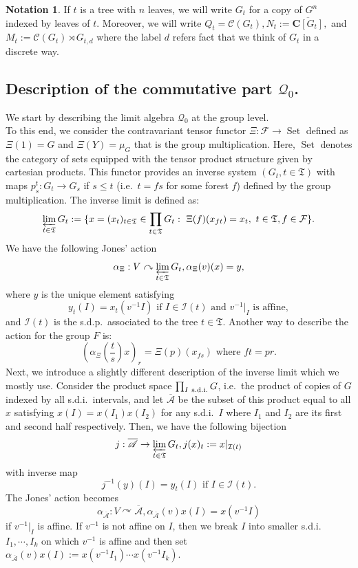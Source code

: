 \documentclass[a4paper,12pt]{amsart}
\numberwithin{equation}{section}
\theoremstyle{definition}
\newtheorem{notation}[theo]{Notation}
\newcommand{\act}{\curvearrowright}
\newcommand{\al}{\alpha}
\newcommand{\oscrA}{{\overline{\mathscr{A}}}}
\newcommand{\scrC}{\mathscr C}
\newcommand{\C}{\mathbf C}
\newcommand{\cF}{\mathcal F}
\newcommand{\cI}{\mathcal I}
\newcommand{\scrQ}{\mathscr Q}
\DeclareMathOperator{\Set}{Set}
\newcommand{\fT}{\mathfrak T}
\begin{document}
\begin{notation}
If $t$ is a tree with $n$ leaves, we will write $G_t$ for a copy of $G^n$ indexed by leaves of $t$.
Moreover, we will write $Q_t=\scrC(G_t), N_t:=\overline{\C [G_t]},$ and $M_t:=\scrC(G_t)\rtimes G_{t,d}$ {where the label $d$ refers fact that we think of $G_t$ in a discrete way.}
\end{notation}

\subsection{Description of the commutative part $\scrQ_0$.}\label{sec:Commutative}
We start by describing the limit algebra $\scrQ_0$ at the group level.\\[0.1cm]
To this end, we consider the contravariant tensor functor $\Xi:\cF\to \Set$ defined as $\Xi(1)=G$ and $\Xi(Y)=\mu_G$ that is the group multiplication.
Here, $\Set$ denotes the category of sets equipped with the tensor product structure given by cartesian products.
This functor provides an inverse system $(G_t, t\in\fT)$ with maps $p_s^{t}:G_{t}\to G_s$ if $s\leq t$ (i.e.~$t=fs$ for some forest $f$) defined by the group multiplication.
The inverse limit is defined as:
$$\varprojlim_{t\in\fT} G_t := \{ x=(x_t)_{t\in \fT} \in \prod_{t\in \fT} G_t : \ \Xi(f)(x_{ft}) = x_t ,\ t\in\fT, f\in\cF\}.$$
We have the following Jones' action 
$$\alpha_\Xi:V\act \varprojlim_{t\in\fT} G_t, \al_\Xi(v)(x) =y,$$
where $y$ is the unique element satisfying $$y_t(I) = x_t(v^{-1} I) \text{ if } I\in\cI(t) \text{ and } v^{-1}|_I \text{ is affine} ,$$
and $\cI(t)$ is the s.d.p.~associated to the tree $t\in\fT.$
Another way to describe the action for the group $F$ is:
$$(\alpha_\Xi(\dfrac{t}{s})x)_r = \Xi(p)(x_{fs}) \text{ where } ft = pr.$$
Next, we introduce a slightly different description of the inverse limit which we mostly use.
Consider the product space $\prod_{I \ \textup{s.d.i.}} G$, i.e.~the product of copies of $G$ indexed by all s.d.i.~intervals, and let $\oscrA$ be the subset of this product equal to all $x$ satisfying $x(I) = x(I_1)x(I_2)$ for any s.d.i.~$I$ where $I_1$ and $I_2$ are its first and second half respectively.
Then, we have the following bijection 
$$j:\oscrA\to \varprojlim_{t\in\fT} G_t, j(x)_t := x|_{\cI(t)}$$
with inverse map
$$j^{-1}(y)(I) = y_t(I) \text{ if } I\in \cI(t).$$
The Jones' action becomes $$\al_\oscrA:V\act \oscrA, \al_\oscrA(v) x (I) = x(v^{-1} I)$$
if $v^{-1}|_I$ is affine.
If $v^{-1}$ is not affine on $I$, then we break $I$ into smaller s.d.i.~$I_1,\cdots,I_k$ on which $v^{-1}$ is affine and then set $\al_\oscrA(v) x (I) := x(v^{-1} I_1)\cdots x(v^{-1} I_k)$.\\[0.1cm]
\end{document}
